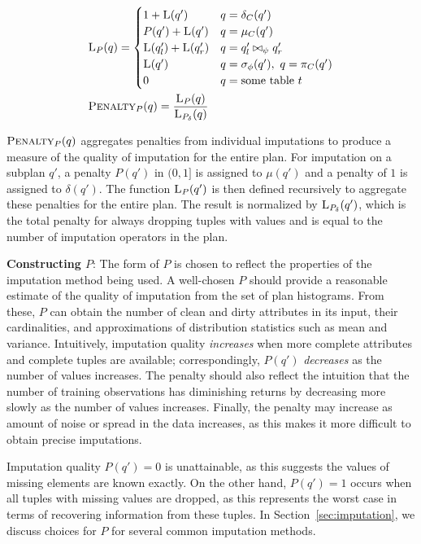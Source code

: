 {\begin{align*}
    &\textsc{L}_{P}(q) = \begin{cases}
     1 + \textsc{L}(q') & q = \delta_C(q') \\
     P(q') + \textsc{L}(q') & q = \mu_C(q') \\
     \textsc{L}(q_l') + \textsc{L}(q_r') & q = q_l' \bowtie_\psi q_r' \\
     \textsc{L}(q') & q = \sigma_\phi(q'),\ q = \pi_C(q') \\
     0 & q = \text{some table } t\\
  \end{cases}\\
    &\textsc{Penalty}_{P}(q) = \frac{\textsc{L}_{P}(q)}{\textsc{L}_{P_\delta}(q)}
\end{align*}

$\textsc{Penalty}_{P}(q)$ aggregates penalties from individual imputations to produce a measure of the quality of imputation for the entire plan.
For imputation on a subplan $q'$, a penalty $P(q')$ in $(0,1]$ is assigned to $\mu(q')$
and a penalty of $1$ is assigned to $\delta(q')$.
The function $\textsc{L}_{P}(q')$ is then defined recursively to aggregate these penalties for the entire plan. 
The result is normalized by $\textsc{L}_{P_\delta}(q')$, which is the total penalty for always dropping tuples with \nullv{} values and is equal to the number of imputation operators in the plan.

\textbf{Constructing $P$}:
The form of $P$ is chosen to reflect the properties of the imputation method being used.
A well-chosen $P$ should provide a reasonable estimate of the quality of imputation from the set of plan histograms.
From these, $P$ can obtain the number of clean and dirty attributes in its input, their cardinalities, and approximations of distribution statistics such as mean and variance.
Intuitively, imputation quality \textit{increases} when more complete attributes and complete tuples are available; correspondingly, $P(q')$ \textit{decreases} as the number of values increases.
The penalty should also reflect the intuition that the number of training observations has diminishing returns by decreasing more slowly as the number of values increases.
Finally, the penalty may increase as amount of noise or spread in the data increases, as this makes it more difficult to obtain precise imputations.

Imputation quality $P(q')=0$ is unattainable, as this suggests the values of missing elements are known exactly.
On the other hand, $P(q')=1$ occurs when all tuples with missing values are dropped, as this represents the worst case in terms of recovering information from these tuples.
In Section~\ref{sec:imputation}, we discuss choices for $P$ for several common imputation methods.

}
